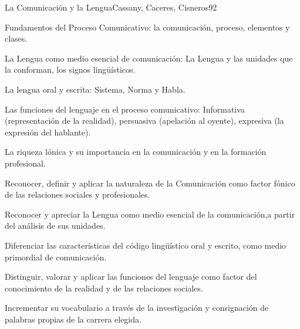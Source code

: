 \begin{syllabus}
\begin{unit}{La Comunicación y la Lengua}{Cassany, Caceres, Cisneros}{9}{2}
\begin{topics}
      \item Fundamentos del Proceso Comunicativo: la comunicación, proceso, elementos y clases. 
      \item La Lengua como medio esencial de comunicación: La Lengua y las unidades que  la conforman, los signos lingüísticos.
      \item La lengua oral y escrita: Sistema, Norma y Habla. 
      \item Las funciones del lenguaje en el proceso comunicativo: Informativa (representación de la realidad), persuasiva (apelación al oyente), expresiva (la expresión del hablante).
      \item La riqueza lónica y su importancia en la comunicación y en la formación profesional.
\end{topics}
\begin{learningoutcomes}
   \item Reconocer, definir y aplicar la naturaleza de la Comunicación como factor fónico de las relaciones sociales y profesionales.
   \item Reconocer y apreciar la Lengua como medio esencial de la comunicación,a partir del análisis de sus unidades.
   \item Diferenciar las características del código lingüístico oral y escrito,
   como medio primordial de comunicación.
   \item Distinguir, valorar y aplicar las funciones del lenguaje como factor del conocimiento de la realidad y de las relaciones sociales.
   \item Incrementar su vocabulario a través de la investigación y consignación de palabras propias de la carrera elegida.
\end{learningoutcomes}

\end{unit}


\end{syllabus}
